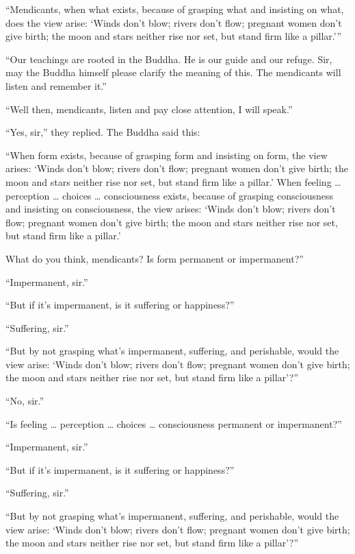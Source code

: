 \documentclass[12pt,openany]{book}%
\begin{document}
“Mendicants, when what exists, because of grasping what and insisting on what, does the view arise: ‘Winds don’t blow; rivers don’t flow; pregnant women don’t give birth; the moon and stars neither rise nor set, but stand firm like a pillar.’” 

“Our teachings are rooted in the Buddha. He is our guide and our refuge. Sir, may the Buddha himself please clarify the meaning of this. The mendicants will listen and remember it.” 

“Well then, mendicants, listen and pay close attention, I will speak.” 

“Yes, sir,” they replied. The Buddha said this: 

“When form exists, because of grasping form and insisting on form, the view arises: ‘Winds don’t blow; rivers don’t flow; pregnant women don’t give birth; the moon and stars neither rise nor set, but stand firm like a pillar.’ When feeling … perception … choices … consciousness exists, because of grasping consciousness and insisting on consciousness, the view arises: ‘Winds don’t blow; rivers don’t flow; pregnant women don’t give birth; the moon and stars neither rise nor set, but stand firm like a pillar.’ 

What do you think, mendicants? Is form permanent or impermanent?” 

“Impermanent, sir.” 

“But if it’s impermanent, is it suffering or happiness?” 

“Suffering, sir.” 

“But by not grasping what’s impermanent, suffering, and perishable, would the view arise: ‘Winds don’t blow; rivers don’t flow; pregnant women don’t give birth; the moon and stars neither rise nor set, but stand firm like a pillar’?” 

“No, sir.” 

“Is feeling … perception … choices … consciousness permanent or impermanent?” 

“Impermanent, sir.” 

“But if it’s impermanent, is it suffering or happiness?” 

“Suffering, sir.” 

“But by not grasping what’s impermanent, suffering, and perishable, would the view arise: ‘Winds don’t blow; rivers don’t flow; pregnant women don’t give birth; the moon and stars neither rise nor set, but stand firm like a pillar’?” 
\end{document}
